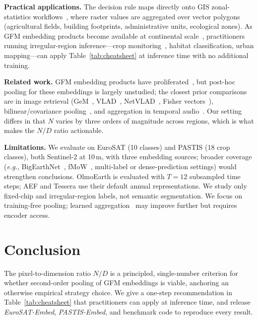 \documentclass[journal]{IEEEtran}
\newcommand{\eg}{\textit{e.g.}}
\begin{document}
\textbf{Practical applications.} The decision rule maps directly onto GIS zonal-statistics workflows~\cite{cressie2015statistics,eo4geoobia}, where raster values are aggregated over vector polygons (agricultural fields, building footprints, administrative units, ecological zones). As GFM embedding products become available at continental scale~\cite{fang2026earthembeddingsproductstaxonomy}, practitioners running irregular-region inference---crop monitoring~\cite{kerner2025ftw}, habitat classification, urban mapping---can apply Table~\ref{tab:cheatsheet} at inference time with no additional training.

\textbf{Related work.} GFM embedding products have proliferated~\cite{jakubik2023prithvi,cong2022satmae,bastani2023satlaspretrain,brown2025alphaearth,herzog2025olmoearth,feng2025tesseratemporalembeddingssurface}, but post-hoc pooling for these embeddings is largely unstudied; the closest prior comparisons are in image retrieval (GeM~\cite{radenovic2018gem}, VLAD~\cite{jegou2010vlad}, NetVLAD~\cite{arandjelovic2016netvlad}, Fisher vectors~\cite{perronnin2010improving}), bilinear/covariance pooling~\cite{lin2015bilinear}, and aggregation in temporal audio~\cite{miech2017learnable}. Our setting differs in that $N$ varies by three orders of magnitude across regions, which is what makes the $N/D$ ratio actionable.

\textbf{Limitations.} We evaluate on EuroSAT (10 classes) and PASTIS (18 crop classes), both Sentinel-2 at 10\,m, with three embedding sources; broader coverage (\eg, BigEarthNet~\cite{sumbul2019bigearthnet}, fMoW~\cite{christie2018functional}, multi-label or dense-prediction settings) would strengthen conclusions. OlmoEarth is evaluated with $T{=}12$ subsampled time steps; AEF and Tessera use their default annual representations. We study only fixed-chip and irregular-region labels, not semantic segmentation. We focus on training-free pooling; learned aggregation~\cite{touvron2022augmenting} may improve further but requires encoder access.

\section{Conclusion}

The pixel-to-dimension ratio $N/D$ is a principled, single-number criterion for whether second-order pooling of GFM embeddings is viable, anchoring an otherwise empirical strategy choice. We give a one-step recommendation in Table~\ref{tab:cheatsheet} that practitioners can apply at inference time, and release \emph{EuroSAT-Embed}, \emph{PASTIS-Embed}, and benchmark code to reproduce every result.



\end{document}
